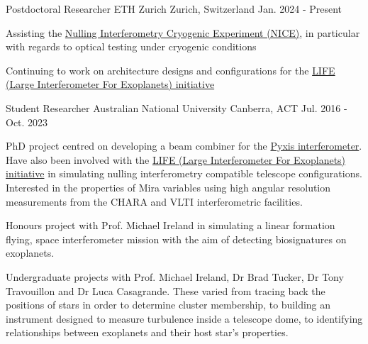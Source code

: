 
\begin{cventries}

\cventry
  {Postdoctoral Researcher} %
  {ETH Zurich} %
  {Zurich, Switzerland} %
  {Jan. 2024 - Present} %
  {
    \begin{cvitems} %
      \item {Assisting the \href{https://quanz-group.ethz.ch/research/instrumentation/nice.html}{Nulling Interferometry Cryogenic Experiment (NICE)}, in particular with regards to optical testing under cryogenic conditions}
      \item {Continuing to work on architecture designs and configurations for the \href{https://www.life-space-mission.com}{LIFE (Large Interferometer For Exoplanets) initiative}}
     \end{cvitems}
  }

\cventry
    {Student Researcher} %
    {Australian National University} %
    {Canberra, ACT} %
    {Jul. 2016 - Oct. 2023} %
    {
      \begin{cvitems} %
        \item {PhD project centred on developing a beam combiner for the \href{https://www.mso.anu.edu.au/pyxis}{Pyxis interferometer}. Have also been involved with the \href{https://www.life-space-mission.com}{LIFE (Large Interferometer For Exoplanets) initiative} in simulating nulling interferometry compatible telescope configurations. Interested in the properties of Mira variables using high angular resolution measurements from the CHARA and VLTI interferometric facilities.}
        \item {Honours project with Prof. Michael Ireland in simulating a linear formation flying, space interferometer mission with the aim of detecting biosignatures on exoplanets.}
        \item {Undergraduate projects with Prof. Michael Ireland, Dr Brad Tucker, Dr Tony Travouillon and Dr Luca Casagrande. These varied from tracing back the positions of stars in order to determine cluster membership, to building an instrument designed to measure turbulence inside a telescope dome, to identifying relationships between exoplanets and their host star's properties.}
      \end{cvitems}
    }


\end{cventries}
